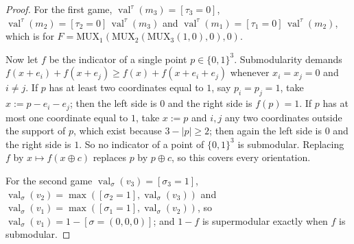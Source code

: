 \documentclass[11pt]{article}
\theoremstyle{plain}
\theoremstyle{definition}
\DeclareMathOperator{\val}{val}
\begin{document}
\begin{proof}
For the first game, $\val^{\tau}(m_3)=[\tau_3=0]$,
$\val^{\tau}(m_2)=[\tau_2=0]\,\val^{\tau}(m_3)$ and
$\val^{\tau}(m_1)=[\tau_1=0]\,\val^{\tau}(m_2)$, which is
 for
$F=\mathrm{MUX}_1(\mathrm{MUX}_2(\mathrm{MUX}_3(1,0),0),0)$.

Now let $f$ be the indicator of a single point $p\in\{0,1\}^{3}$. Submodularity
demands $f(x{+}e_i)+f(x{+}e_j)\ge f(x)+f(x{+}e_i{+}e_j)$ whenever
$x_i=x_j=0$ and $i\ne j$. If $p$ has at least two coordinates equal to $1$, say
$p_i=p_j=1$, take $x:=p-e_i-e_j$; then the left side is $0$ and the right side
is $f(p)=1$. If $p$ has at most one coordinate equal to $1$, take $x:=p$ and
$i,j$ any two coordinates outside the support of $p$, which exist because
$3-|p|\ge2$; then again the left side is $0$ and the right side is $1$. So no
indicator of a point of $\{0,1\}^{3}$ is submodular. Replacing $f$ by
$x\mapsto f(x\oplus c)$ replaces $p$ by $p\oplus c$, so this covers every
orientation.

For the second game $\val_{\sigma}(v_3)=[\sigma_3=1]$,
$\val_{\sigma}(v_2)=\max([\sigma_2=1],\val_\sigma(v_3))$ and
$\val_{\sigma}(v_1)=\max([\sigma_1=1],\val_\sigma(v_2))$, so
$\val_{\sigma}(v_1)=1-[\sigma=(0,0,0)]$; and $1-f$ is supermodular exactly when
$f$ is submodular.
\end{proof}
\end{document}

